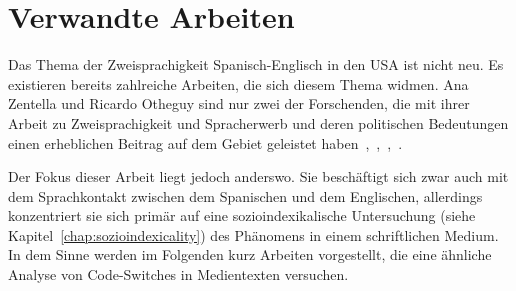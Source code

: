 \section{Verwandte Arbeiten}
\label{chap:related-works}

Das Thema der Zweisprachigkeit Spanisch-Englisch in den USA ist nicht neu.
Es existieren bereits zahlreiche Arbeiten, die sich diesem Thema widmen.
Ana Zentella und Ricardo Otheguy sind nur zwei der Forschenden, die mit ihrer Arbeit zu Zweisprachigkeit und Spracherwerb und deren politischen Bedeutungen einen erheblichen Beitrag auf dem Gebiet geleistet haben~\cite{OthZen11},~\cite{Zentella90},~\cite{Zentella97},~\cite{Zentella07}.

Der Fokus dieser Arbeit liegt jedoch anderswo.
Sie beschäftigt sich zwar auch mit dem Sprachkontakt zwischen dem Spanischen und dem Englischen, allerdings konzentriert sie sich primär auf eine sozioindexikalische Untersuchung (siehe Kapitel~\ref{chap:sozioindexicality}) des Phänomens in einem schriftlichen Medium.
In dem Sinne werden im Folgenden kurz Arbeiten vorgestellt, die eine ähnliche Analyse von Code-Switches in Medientexten versuchen.

